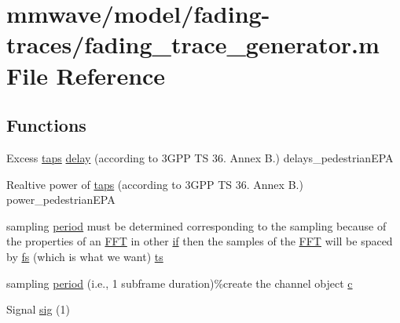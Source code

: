 \hypertarget{mmwave_2model_2fading-traces_2fading__trace__generator_8m}{}\section{mmwave/model/fading-\/traces/fading\+\_\+trace\+\_\+generator.m File Reference}
\label{mmwave_2model_2fading-traces_2fading__trace__generator_8m}
\subsection*{Functions}
\begin{DoxyCompactItemize}
\item 
Excess \hyperlink{mmwave_2model_2fading-traces_2fading__trace__generator_8m_a36e13439e5ec878d93e3b760df348959}{taps} \hyperlink{mmwave_2model_2fading-traces_2fading__trace__generator_8m_a7964e6aa8f61a9d28973c8267a606ad8}{delay} (according to 3\+G\+P\+P T\+S 36. Annex B.) delays\+\_\+pedestrian\+E\+PA
\item 
Realtive power of \hyperlink{mmwave_2model_2fading-traces_2fading__trace__generator_8m_a36e13439e5ec878d93e3b760df348959}{taps} (according to 3\+G\+P\+P T\+S 36. Annex B.) power\+\_\+pedestrian\+E\+PA
\item 
sampling \hyperlink{mmwave_2model_2fading-traces_2fading__trace__generator_8m_ae10c944bf9f3fba2686a5885ecc192d7}{period} must be determined corresponding to the sampling because of the properties of an \hyperlink{mmwave_2model_2fading-traces_2fading__trace__generator_8m_ac4962f4e70dbd9d6f4994fd9698b6932}{F\+FT} in other \hyperlink{loss__OH__large__cities__urban_8m_ac77b6cfa3068152087725fe54b4ae8c8}{if} then the samples of the \hyperlink{mmwave_2model_2fading-traces_2fading__trace__generator_8m_ac4962f4e70dbd9d6f4994fd9698b6932}{F\+FT} will be spaced by \hyperlink{mmwave_2model_2fading-traces_2fading__trace__generator_8m_a828bad5070b721e1b73311b8607e5d25}{fs} (which is what we want) \hyperlink{mmwave_2model_2fading-traces_2fading__trace__generator_8m_ada841f58d7be618bfbc76c87e7d44086}{ts}
\item 
sampling \hyperlink{mmwave_2model_2fading-traces_2fading__trace__generator_8m_ae10c944bf9f3fba2686a5885ecc192d7}{period} (i.\+e., 1 subframe duration)\%create the channel object \hyperlink{mmwave_2model_2fading-traces_2fading__trace__generator_8m_ae0323a9039add2978bf5b49550572c7c}{c}
\item 
Signal \hyperlink{mmwave_2model_2fading-traces_2fading__trace__generator_8m_a9aeb058cb8f100cffa2c026e9ab5edf1}{sig} (1)
\end{DoxyCompactItemize}

